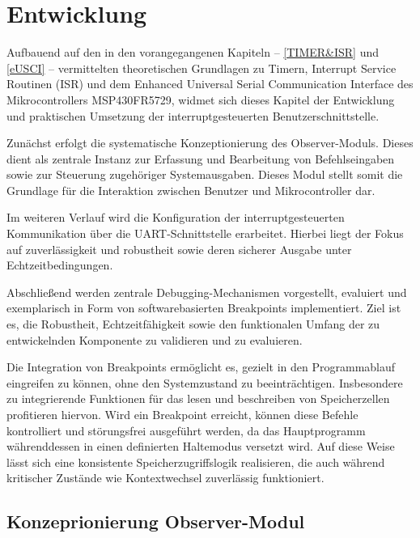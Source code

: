 
\chapter{Entwicklung}
\label{Entwicklung}

Aufbauend auf den in den vorangegangenen Kapiteln -- \ref{TIMER&ISR} und \ref{eUSCI} -- vermittelten theoretischen Grundlagen zu Timern, Interrupt Service Routinen (ISR) und dem Enhanced Universal Serial Communication Interface des Mikrocontrollers MSP430FR5729, widmet sich dieses Kapitel der Entwicklung und praktischen Umsetzung der interruptgesteuerten Benutzerschnittstelle.

Zun\"achst erfolgt die systematische Konzeptionierung des \glqq Observer-Moduls\grqq. Dieses dient als zentrale Instanz zur Erfassung und Bearbeitung von Befehlseingaben sowie zur Steuerung zugeh\"origer Systemausgaben. Dieses Modul stellt somit die Grundlage f\"ur die Interaktion zwischen Benutzer und Mikrocontroller dar.

Im weiteren Verlauf wird die Konfiguration der interruptgesteuerten Kommunikation \"uber die UART-Schnittstelle erarbeitet. Hierbei liegt der Fokus auf zuverl\"assigkeit und robustheit sowie deren sicherer Ausgabe unter Echtzeitbedingungen.

Abschlie{\ss}end werden zentrale Debugging-Mechanismen vorgestellt, evaluiert und exemplarisch in Form von softwarebasierten Breakpoints implementiert. Ziel ist es, die Robustheit, Echtzeitf\"ahigkeit sowie den funktionalen Umfang der zu entwickelnden Komponente zu validieren und zu evaluieren.

Die Integration von Breakpoints erm\"oglicht es, gezielt in den Programmablauf eingreifen zu k\"onnen, ohne den Systemzustand zu beeintr\"achtigen. Insbesondere zu integrierende Funktionen f\"ur das lesen und beschreiben von Speicherzellen profitieren hiervon. Wird ein Breakpoint erreicht, k\"onnen diese Befehle kontrolliert und st\"orungsfrei ausgef\"uhrt werden, da das Hauptprogramm w\"ahrenddessen in einen definierten Haltemodus versetzt wird. Auf diese Weise l\"asst sich eine konsistente Speicherzugriffslogik realisieren, die auch w\"ahrend kritischer Zust\"ande wie Kontextwechsel zuverl\"assig funktioniert.\AI

\section{Konzeprionierung Observer-Modul}
\label{ObserverModulKonzept}

